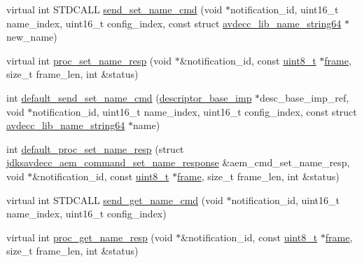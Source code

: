 \begin{DoxyCompactItemize}
\item 
virtual int S\+T\+D\+C\+A\+LL \hyperlink{classavdecc__lib_1_1descriptor__base__imp_af0bb05af3bf67f2ab0eb522096011592}{send\+\_\+set\+\_\+name\+\_\+cmd} (void $\ast$notification\+\_\+id, uint16\+\_\+t name\+\_\+index, uint16\+\_\+t config\+\_\+index, const struct \hyperlink{structavdecc__lib_1_1avdecc__lib__name__string64}{avdecc\+\_\+lib\+\_\+name\+\_\+string64} $\ast$new\+\_\+name)
\item 
virtual int \hyperlink{classavdecc__lib_1_1descriptor__base__imp_a182c43d9f31980bb74f05956b1323624}{proc\+\_\+set\+\_\+name\+\_\+resp} (void $\ast$\&notification\+\_\+id, const \hyperlink{stdint_8h_aba7bc1797add20fe3efdf37ced1182c5}{uint8\+\_\+t} $\ast$\hyperlink{gst__avb__playbin_8c_ac8e710e0b5e994c0545d75d69868c6f0}{frame}, size\+\_\+t frame\+\_\+len, int \&status)
\item 
int \hyperlink{classavdecc__lib_1_1descriptor__base__imp_aed899a0eaaaa06a02569135f844ffce8}{default\+\_\+send\+\_\+set\+\_\+name\+\_\+cmd} (\hyperlink{classavdecc__lib_1_1descriptor__base__imp}{descriptor\+\_\+base\+\_\+imp} $\ast$desc\+\_\+base\+\_\+imp\+\_\+ref, void $\ast$notification\+\_\+id, uint16\+\_\+t name\+\_\+index, uint16\+\_\+t config\+\_\+index, const struct \hyperlink{structavdecc__lib_1_1avdecc__lib__name__string64}{avdecc\+\_\+lib\+\_\+name\+\_\+string64} $\ast$name)
\item 
int \hyperlink{classavdecc__lib_1_1descriptor__base__imp_a2f52c3b9a7ad6f490bed0c96a9136bc3}{default\+\_\+proc\+\_\+set\+\_\+name\+\_\+resp} (struct \hyperlink{structjdksavdecc__aem__command__set__name__response}{jdksavdecc\+\_\+aem\+\_\+command\+\_\+set\+\_\+name\+\_\+response} \&aem\+\_\+cmd\+\_\+set\+\_\+name\+\_\+resp, void $\ast$\&notification\+\_\+id, const \hyperlink{stdint_8h_aba7bc1797add20fe3efdf37ced1182c5}{uint8\+\_\+t} $\ast$\hyperlink{gst__avb__playbin_8c_ac8e710e0b5e994c0545d75d69868c6f0}{frame}, size\+\_\+t frame\+\_\+len, int \&status)
\item 
virtual int S\+T\+D\+C\+A\+LL \hyperlink{classavdecc__lib_1_1descriptor__base__imp_a4e8ce103baabbd5fc07deabfb95f791a}{send\+\_\+get\+\_\+name\+\_\+cmd} (void $\ast$notification\+\_\+id, uint16\+\_\+t name\+\_\+index, uint16\+\_\+t config\+\_\+index)
\item 
virtual int \hyperlink{classavdecc__lib_1_1descriptor__base__imp_ac4e290a88039a8e4915f7b9f8738881f}{proc\+\_\+get\+\_\+name\+\_\+resp} (void $\ast$\&notification\+\_\+id, const \hyperlink{stdint_8h_aba7bc1797add20fe3efdf37ced1182c5}{uint8\+\_\+t} $\ast$\hyperlink{gst__avb__playbin_8c_ac8e710e0b5e994c0545d75d69868c6f0}{frame}, size\+\_\+t frame\+\_\+len, int \&status)

\end{DoxyCompactItemize}
